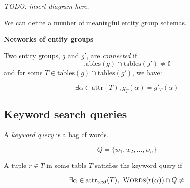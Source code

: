 \documentclass[conference]{IEEEtran}
\newcommand{\attr}{\mathrm{attr}}
\newcommand{\textattr}{\mathrm{attr}_\mathrm{text}}
\newcommand{\Tables}{\mathrm{tables}}
\newcommand{\Words}{\textsc{Words}}
\newcommand{\todo}[1]{{\em TODO: #1}}
\begin{document}
\todo{insert diagram here.}


We can define a number of meaningful entity group schemas.

{\bf Networks of entity groups}

Two entity groups, $g$ and $g'$, are {\em connected} if 
$$\Tables(g)\cap\Tables(g')\not=\emptyset$$
and for some $T\in\Tables(g)\cap\Tables(g')$, we have:

$$\exists\alpha\in\attr(T), g_T(\alpha) = g'_T(\alpha)$$

\subsection{Keyword search queries}

A {\em keyword query} is a bag of words.

$$ Q = \{w_1, w_2, \dots, w_n\} $$

A tuple $r\in T$ in some table $T$ satisfies the keyword query if

$$\exists \alpha\in\textattr(T),\ \Words(r(\alpha))\cap Q\not=\empty$$



\end{document}
